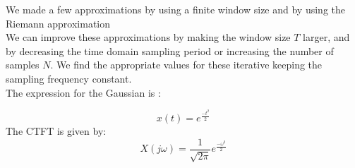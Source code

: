 \documentclass{article}
\begin{document}
\noindent
We made a few approximations by using a finite window size and by using the Riemann approximation \\

\noindent
We can improve these approximations by making the window size $T$ larger, and by 
decreasing the time domain sampling period or increasing the number of samples $N$. 
We find the appropriate values for these iterative keeping the sampling frequency constant. \\

\noindent
The expression for the Gaussian is :

\begin{equation}
    x(t) = e^{\frac{-t^2}{2}}    
\end{equation}
The CTFT is given by:
\begin{equation}
X(j \omega) = \frac{1}{\sqrt{2 \pi}}e^{\frac{-\omega^2}{2}}    
\end{equation}
\end{document}
